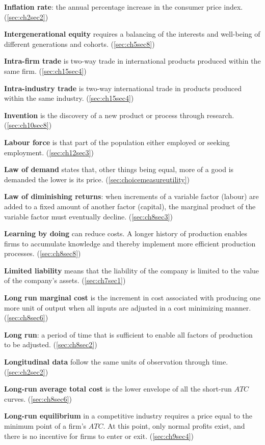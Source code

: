 \textbf{Inflation rate}: the annual percentage increase in the consumer price index. (\ref{sec:ch2sec2})

\textbf{Intergenerational equity} requires a balancing of the interests and well-being of different generations and cohorts. (\ref{sec:ch5sec8})

\textbf{Intra-firm trade} is two-way trade in international products produced within the same firm. (\ref{sec:ch15sec4})

\textbf{Intra-industry trade} is two-way international trade in products produced within the same industry. (\ref{sec:ch15sec4})

\textbf{Invention} is the discovery of a new product or process through research. (\ref{sec:ch10sec8})

\textbf{Labour force} is that part of the population either employed or seeking employment. (\ref{sec:ch12sec3})

\textbf{Law of demand} states that, other things being equal, more of a good is demanded the lower is its price. (\ref{sec:choicemeasureutility})

\textbf{Law of diminishing returns}: when increments of a variable factor (labour) are added to a fixed amount of another factor (capital), the marginal product of the variable factor must eventually decline. (\ref{sec:ch8sec3})

\textbf{Learning by doing} can reduce costs. A longer history of production enables firms to accumulate knowledge and thereby implement more efficient production processes. (\ref{sec:ch8sec8})

\textbf{Limited liability} means that the liability of the company is limited to the value of the company's assets. (\ref{sec:ch7sec1})

\textbf{Long run marginal cost} is the increment in cost associated with producing one more unit of output when all inputs are adjusted in a cost minimizing manner. (\ref{sec:ch8sec6})

\textbf{Long run}: a period of time that is sufficient to enable all factors of production to be adjusted. (\ref{sec:ch8sec2})

\textbf{Longitudinal data} follow the same units of observation through time. (\ref{sec:ch2sec2})

\textbf{Long-run average total cost} is the lower envelope of all the short-run $ATC$ curves. (\ref{sec:ch8sec6})

\textbf{Long-run equilibrium} in a competitive industry requires a price equal to the minimum point of a firm's $ATC$. At this point, only normal profits exist, and there is no incentive for firms to enter or exit. (\ref{sec:ch9sec4})

